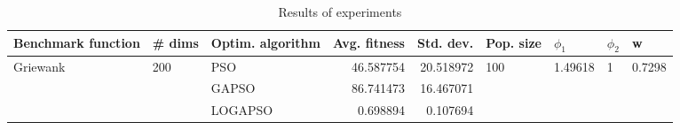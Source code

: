 \begin{table}
\centering
\caption{Results of experiments}
\begin{tabular}{lllrrllll}
\toprule
       Benchmark function &              \# dims & Optim. algorithm &  Avg. fitness &  Std. dev. &            Pop. size &               $\phi_{1}$ &         $\phi_{2}$ &                       w \\
\midrule
\multirow{3}{*}{Griewank} & \multirow{3}{*}{200} &              PSO &     46.587754 &  20.518972 & \multirow{3}{*}{100} & \multirow{3}{*}{1.49618} & \multirow{3}{*}{1} & \multirow{3}{*}{0.7298} \\
                          &                      &            GAPSO &     86.741473 &  16.467071 &                      &                          &                    &                         \\
                          &                      &          LOGAPSO &      0.698894 &   0.107694 &                      &                          &                    &                         \\
\bottomrule
\end{tabular}
\end{table}
